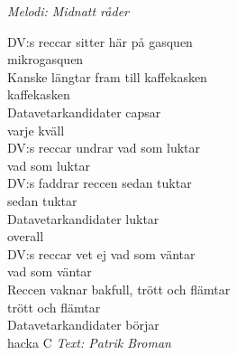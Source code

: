 {\footnotesize\textit{Melodi: Midnatt råder}}\par
\vspace{10pt}
\par
DV:s reccar sitter här på gasquen \\
mikrogasquen\\
Kanske längtar fram till kaffekasken\\
kaffekasken\\
\vspace{10pt}
Datavetarkandidater capsar\\
varje kväll\\
\vspace{10pt}
DV:s reccar undrar vad som luktar\\
vad som luktar\\
DV:s faddrar reccen sedan tuktar\\
sedan tuktar\\
\vspace{10pt}
Datavetarkandidater luktar\\
overall\\
\vspace{10pt}
DV:s reccar vet ej vad som väntar\\
vad som väntar\\
Reccen vaknar bakfull, trött och flämtar\\
trött och flämtar\\
\vspace{10pt}
Datavetarkandidater börjar\\
hacka C
\vspace{10pt}
{\footnotesize\textit{Text: Patrik Broman}}
